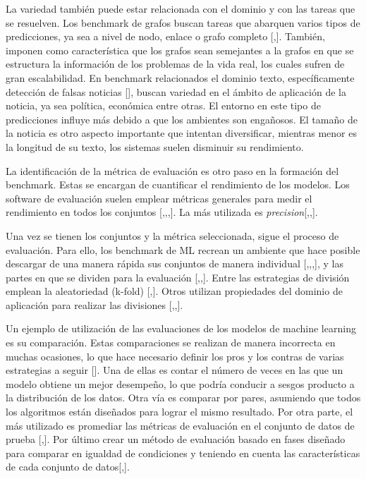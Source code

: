 La variedad también puede estar relacionada con el dominio y con las tareas que se resuelven. Los benchmark de grafos buscan tareas que abarquen varios 
tipos de predicciones, ya sea a nivel de nodo, enlace o grafo completo [\cite{5},\cite{6}]. También, imponen como característica que los grafos sean semejantes a 
la grafos en que se estructura la información de los problemas de la vida real, los cuales sufren de gran escalabilidad. En benchmark relacionados el dominio texto, 
específicamente detección de falsas noticias [\cite{4}], buscan variedad en el ámbito de aplicación de la noticia, ya sea política, económica entre otras. El entorno 
en este tipo de predicciones influye más debido a que los ambientes son engañosos. El tamaño de la noticia es otro aspecto importante que intentan diversificar, 
mientras menor es la longitud de su texto, los sistemas suelen disminuir su rendimiento.

La identificación de la métrica de evaluación es otro paso en la formación del benchmark. Estas se encargan de cuantificar el rendimiento de los modelos. Los software de 
evaluación suelen emplear métricas generales para medir el rendimiento en todos los conjuntos [\cite{3},\cite{7},\cite{5},\cite{6}]. La más 
utilizada es \textit{precision}[\cite{4},\cite{1},\cite{2}].

Una vez se tienen los conjuntos y la métrica seleccionada, sigue el proceso de evaluación. Para ello, los benchmark de ML recrean un ambiente que hace posible 
descargar de una manera rápida sus conjuntos de manera individual [\cite{2},\cite{3},\cite{5},\cite{6}], y las partes en que se dividen para la evaluación 
[\cite{3},\cite{4},\cite{7}]. Entre las estrategias de división emplean la aleatoriedad (k-fold) [\cite{1},\cite{2}]. Otros utilizan propiedades del dominio de 
aplicación para realizar las divisiones [\cite{4},\cite{5},\cite{6}].

Un ejemplo de utilización de las evaluaciones de los modelos de machine learning es su comparación. Estas comparaciones se realizan de manera incorrecta en muchas 
ocasiones, lo que hace necesario definir los pros y los contras de varias estrategias a seguir [\cite{1}]. Una de ellas es contar el número de veces en las que un 
modelo obtiene un mejor desempeño, lo que podría conducir a sesgos producto a la distribución de los datos. Otra vía es comparar por pares, asumiendo que 
todos los algoritmos están diseñados para lograr el mismo resultado. Por otra parte, el más utilizado es promediar las métricas de evaluación en el conjunto 
de datos de prueba [\cite{3},\cite{2}]. Por último crear un método de evaluación basado en fases diseñado para comparar en igualdad de condiciones 
y teniendo en cuenta las características de cada conjunto de datos[\cite{1},\cite{7}].  

